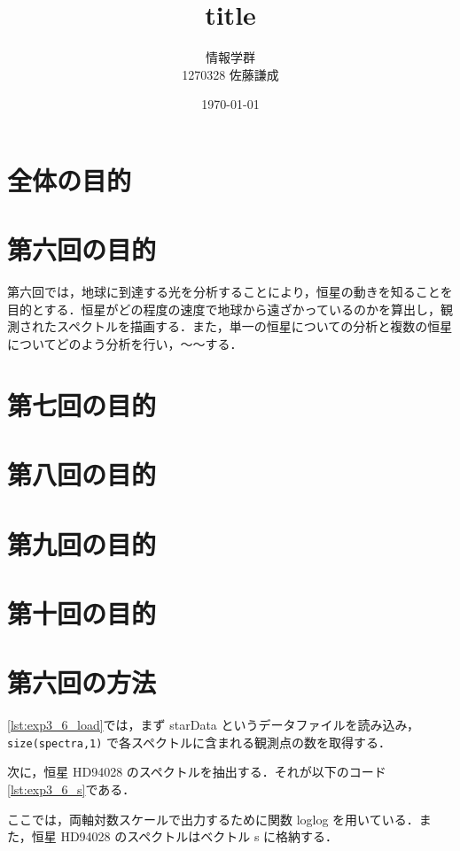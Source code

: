 
\title{title}
\author{情報学群 \\ 1270328 佐藤謙成}
\date{\today}


\maketitle

\begin{abstract}
    
\end{abstract}
\section{全体の目的}
\section{第六回の目的}
    第六回では，地球に到達する光を分析することにより，恒星の動きを知ることを目的とする．恒星がどの程度の速度で地球から遠ざかっているのかを算出し，観測されたスペクトルを描画する．また，単一の恒星についての分析と複数の恒星についてどのよう分析を行い，～～する．
\section{第七回の目的}
\section{第八回の目的}
\section{第九回の目的}
\section{第十回の目的}

\section{第六回の方法}
    
    \ref{lst:exp3_6_load}では，まず starData というデータファイルを読み込み，\lstinline|size(spectra,1)| で各スペクトルに含まれる観測点の数を取得する．

    次に，恒星 HD94028 のスペクトルを抽出する．それが以下のコード \ref{lst:exp3_6_s}である．
    
    ここでは，両軸対数スケールで出力するために関数 loglog を用いている．また，恒星 HD94028 のスペクトルはベクトル s に格納する．

